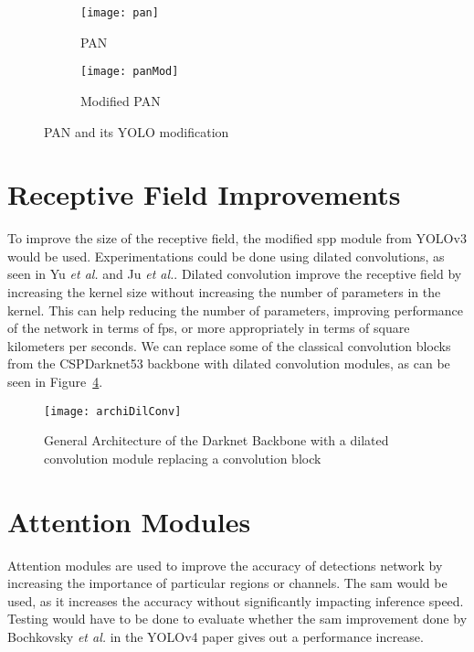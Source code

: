 \begin{figure}[H]
	\centering
	\begin{subfigure}[b]{0.3\textwidth}
		\centering
		\texttt{[image: pan]}
		\caption{PAN}
		\label{fig:pan}
	\end{subfigure}
	\begin{subfigure}[b]{0.3\textwidth}
		\centering
		\texttt{[image: panMod]}
		\caption{Modified PAN}
		\label{fig:panmod}
	\end{subfigure}
	\caption{PAN and its YOLO modification}
	\label{fig:PAN}
\end{figure}

\section{Receptive Field Improvements}

To improve the size of the receptive field, the modified \gls{spp} module from YOLOv3\cite{yolov3} would be used. Experimentations could be done using dilated convolutions, as seen in Yu \textit{et al.}\cite{yu2015} and Ju \textit{et al.}. Dilated convolution improve the receptive field by increasing the kernel size without increasing the number of parameters in the kernel. This can help reducing the number of parameters, improving performance of the network in terms of \gls{fps}, or more appropriately in terms of square kilometers per seconds. We can replace some of the classical convolution blocks from the CSPDarknet53 backbone with dilated convolution modules, as can be seen in Figure~\ref{fig:dilConvDarknet}. 

\begin{figure}[H]
	\centering
	\texttt{[image: archiDilConv]}
	\caption[]{General Architecture of the Darknet Backbone with a dilated convolution module replacing a convolution block}
	\label{fig:dilConvDarknet}
\end{figure}

\section{Attention Modules}
Attention modules are used to improve the accuracy of detections network by increasing the importance of particular regions or channels. The \gls{sam}\cite{sam} would be used, as it increases the accuracy without significantly impacting inference speed. Testing would have to be done to evaluate whether the \gls{sam} improvement done by Bochkovsky \textit{et al.} in the YOLOv4 paper\cite{yolov4} gives out a performance increase.

